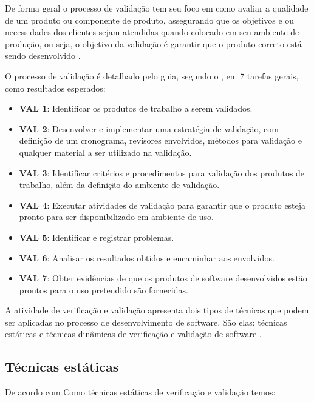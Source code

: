 De forma geral o processo de validação tem seu foco em como avaliar a qualidade de um produto ou componente de produto, assegurando que os objetivos e ou necessidades dos clientes sejam atendidas quando colocado em seu ambiente de produção, ou seja, o objetivo da validação é garantir que o produto correto está sendo desenvolvido \cite{mpsbr}.

O processo de validação é detalhado pelo guia, segundo o \cite{mpsbr}, em 7 tarefas gerais, como resultados esperados:

\begin{itemize}
  \item \textbf{VAL 1}: Identificar os produtos de trabalho a serem validados.
  \item \textbf{VAL 2}: Desenvolver e implementar uma estratégia de validação, com definição de um cronograma,
    revisores envolvidos, métodos para validação e qualquer material a ser utilizado na validação.
  \item \textbf{VAL 3}: Identificar critérios e procedimentos para validação dos produtos de trabalho, além da
    definição do ambiente de validação.
  \item \textbf{VAL 4}: Executar atividades de validação para garantir que o produto esteja pronto para ser
    disponibilizado em ambiente de uso.
  \item \textbf{VAL 5}: Identificar e registrar problemas.
  \item \textbf{VAL 6}: Analisar os resultados obtidos e encaminhar aos envolvidos.
  \item \textbf{VAL 7}: Obter evidências de que os produtos de software desenvolvidos estão prontos para o uso
    pretendido são fornecidas.
\end{itemize}

A atividade de verificação e validação apresenta dois tipos de técnicas que podem ser aplicadas no processo de desenvolvimento de software. São elas: técnicas estáticas e técnicas dinâmicas de verificação e validação de software \cite{myers}.

\subsection{Técnicas estáticas}

De acordo com \cite{myers} Como técnicas estáticas de verificação e validação temos:

